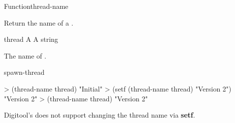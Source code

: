 \documentclass[10pt,twoside,english,pdftex]{article}
\begin{document}
\begin{functiondoc}{Function}{thread-name}{ 
   \returns{} } 

\fnsyntax

\fnpurpose Return the name of a .

\fnsetf
{}

\fnpackage {}

\fnmodule {}

\fnargs
\begin{args}{thread}
\arg[thread] A 
 A string
\end{args}

\fnreturns The name of .

\fnerrors
\nothreads{}

\begin{alsos}{spawn-thread}
\end{alsos}

\fnexamples
\begin{example}
> (thread-name thread)
"Initial"
> (setf (thread-name thread) "Version 2")
"Version 2"
> (thread-name thread)
"Version 2"
\end{example}

\fnnotes Digitool's 
does not support changing the thread name via \textbf{setf}.

\end{functiondoc}

\end{document}
